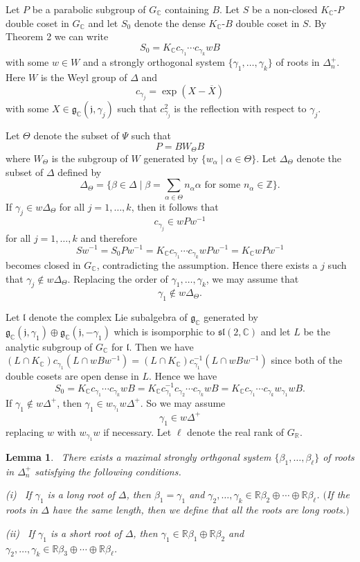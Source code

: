 \documentclass[12pt,a4paper]{amsart}
\def\frak{\mathfrak}
\newtheorem{lemma}[theorem]{Lemma}
\theoremstyle{definition}
\theoremstyle{remark}
\numberwithin{equation}{section}
\def\br{\mathbb R}
\def\bc{\mathbb C}
\def\bz{\mathbb Z}
\begin{document}
Let $P$ be a parabolic subgroup of $G_\bc$ containing $B$. Let $S$ be a non-closed $K_\bc$-$P$ double coset in $G_\bc$ and let $S_0$ denote the dense $K_\bc$-$B$ double coset in $S$. By \cite{M1} Theorem 2 we can write
$$S_0=K_\bc c_{\gamma_1}\cdots c_{\gamma_k}wB$$
with some $w\in W$ and a strongly orthogonal system $\{\gamma_1,\ldots,\gamma_k\}$ of roots in $\Delta^+_n$. Here $W$ is the Weyl group of $\Delta$ and
$$c_{\gamma_j}=\exp (X-\overline{X})$$
with some $X\in\frak{g}_\bc(\frak{j},\gamma_j)$ such that $c_{\gamma_j}^2$ is the reflection with respect to $\gamma_j$.

Let $\Theta$ denote the subset of $\Psi$ such that
$$P=BW_\Theta B$$
where $W_\Theta$ is the subgroup of $W$ generated by $\{w_\alpha\mid \alpha\in\Theta\}$. Let $\Delta_\Theta$ denote the subset of $\Delta$ defined by
$$\Delta_\Theta=\{\beta\in\Delta\mid \beta=\sum_{\alpha\in\Theta} n_\alpha \alpha\mbox{ for some }n_\alpha\in\bz\}.$$
If $\gamma_j\in w\Delta_\Theta$ for all $j=1,\ldots,k$, then it follows that
$$c_{\gamma_j}\in wPw^{-1}$$
for all $j=1,\ldots,k$ and therefore
$$Sw^{-1}=S_0Pw^{-1}=K_\bc c_{\gamma_1}\cdots c_{\gamma_k}wPw^{-1}=K_\bc wPw^{-1}$$
becomes closed in $G_\bc$, contradicting the assumption. Hence there exists a $j$ such that $\gamma_j\notin w\Delta_\Theta$. Replacing the order of $\gamma_1,\ldots,\gamma_k$, we may assume that
$$\gamma_1\notin w\Delta_\Theta.$$

Let $\frak{l}$ denote the complex Lie subalgebra of $\frak{g}_\bc$ generated by $\frak{g}_\bc(\frak{j},\gamma_1)\oplus \frak{g}_\bc(\frak{j},-\gamma_1)$ which is isomporphic to $\frak{sl}(2,\bc)$ and let $L$ be the analytic subgroup of $G_\bc$ for $\frak{l}$. Then we have $(L\cap K_\bc)c_{\gamma_1}(L\cap wBw^{-1})=(L\cap K_\bc)c_{\gamma_1}^{-1}(L\cap wBw^{-1})$ since both of the double cosets are open dense in $L$. Hence we have
$$S_0=K_\bc c_{\gamma_1}\cdots c_{\gamma_k}wB= K_\bc c_{\gamma_1}^{-1}c_{\gamma_2}\cdots c_{\gamma_k}wB =K_\bc c_{\gamma_1}\cdots c_{\gamma_k}w_{\gamma_1}wB.$$
If $\gamma_1\notin w\Delta^+$, then $\gamma_1\in w_{\gamma_1}w\Delta^+$. So we may assume
$$\gamma_1\in w\Delta^+$$
replacing $w$ with $w_{\gamma_1}w$ if necessary. Let $\ell$ denote the real rank of $G_\br$.

\begin{lemma} \ There exists a maximal strongly orthgonal system $\{\beta_1,\ldots,\beta_\ell\}$ of roots in $\Delta^+_n$ satisfying the following conditions.

{\rm (i)} \ If $\gamma_1$ is a long root of $\Delta$, then $\beta_1=\gamma_1$ and $\gamma_2,\ldots,\gamma_k\in \br\beta_2\oplus\cdots \oplus\br\beta_\ell$. $($If the roots in $\Delta$ have the same length, then we define that all the roots are long roots.$)$

{\rm (ii)} \ If $\gamma_1$ is a short root of $\Delta$, then $\gamma_1\in \br\beta_1\oplus\br\beta_2$ and $\gamma_2,\ldots,\gamma_k\in \br\beta_3\oplus\cdots \oplus\br\beta_\ell$.
\end{lemma}
\end{document}
